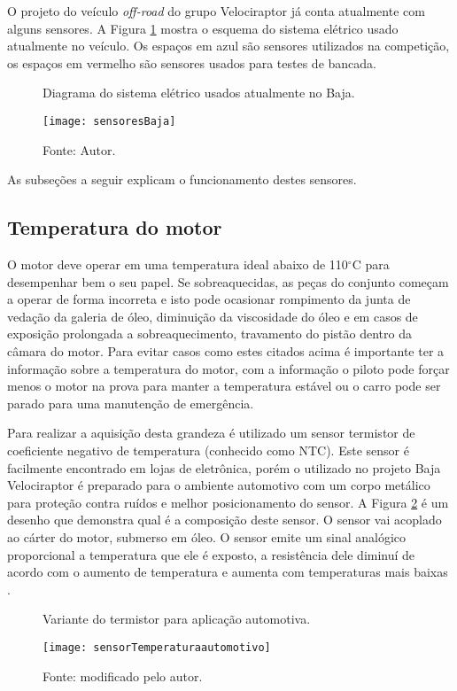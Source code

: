 O projeto do veículo \textit{off-road} do grupo Velociraptor já conta atualmente com alguns sensores. A Figura \ref{fig:sensoresBaja} mostra o esquema do sistema elétrico usado atualmente no veículo. Os espaços em azul são sensores utilizados na competição, os espaços em vermelho são sensores usados para testes de bancada. 

\begin{figure}[!htb]
	\centering
		\caption{Diagrama do sistema elétrico usados atualmente no Baja.}
		\texttt{[image: sensoresBaja]} 
		\caption*{Fonte: Autor.}
		\label{fig:sensoresBaja}
\end{figure} 

As subseções a seguir explicam o funcionamento destes sensores.

\subsection{Temperatura do motor}

O motor deve operar em uma temperatura ideal abaixo de 110$^\circ$C para desempenhar bem o seu papel. Se sobreaquecidas, as peças do conjunto começam a operar de forma incorreta e isto pode ocasionar rompimento da junta de vedação da galeria de óleo, diminuição da viscosidade do óleo e em casos de exposição prolongada a sobreaquecimento, travamento do pistão dentro da câmara do motor. Para evitar casos como estes citados acima é importante ter a informação sobre a temperatura do motor, com a informação o piloto pode forçar menos o motor na prova para manter a temperatura estável ou o carro pode ser parado para uma manutenção de emergência.

Para realizar a aquisição desta grandeza é utilizado um sensor termistor de coeficiente negativo de temperatura (conhecido como NTC). Este sensor é facilmente encontrado em lojas de eletrônica, porém o utilizado no projeto Baja Velociraptor é preparado para o ambiente automotivo com um corpo metálico para proteção contra ruídos e melhor posicionamento do sensor. A Figura \ref{fig:sensorTemperaturaautomotivo} é um desenho que demonstra qual é a composição deste sensor. O sensor vai acoplado ao cárter do motor, submerso em óleo. O sensor emite um sinal analógico proporcional a temperatura que ele é exposto, a resistência dele diminuí de acordo com o aumento de temperatura e aumenta com temperaturas mais baixas \cite{Fraden2016}.  

\begin{figure}[!htb]
	\centering
		\caption{Variante do termistor para aplicação automotiva.}
		\texttt{[image: sensorTemperaturaautomotivo]} 
		\caption*{Fonte:\cite{sensortempauto} modificado pelo autor.}
		\label{fig:sensorTemperaturaautomotivo}
\end{figure} 



